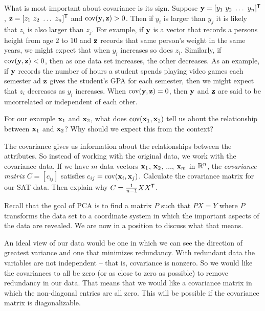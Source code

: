 \begin{pactivity}
\item  What is most important about covariance is its sign. Suppose $\mathbf{y} = [y_1 \ y_2 \ \ldots \ y_n]^{\mathsf{T}}$, $\vz = [z_1 \ z_2 \ \ldots \ z_n]^{\tr}$ and $\text{cov}(\mathbf{y},\mathbf{z}) > 0$. Then if $y_i$ is larger than $y_j$ it is likely that $z_i$ is also larger than $z_j$. For example, if $\mathbf{y}$ is a vector that records a persons height from age $2$ to $10$ and $\mathbf{z}$ records that same person's weight in the same years, we might expect that when $y_i$ increases so does $z_i$. Similarly, if $\text{cov}(\mathbf{y},\mathbf{z}) < 0$, then as one data set increases, the other decreases. As an example, if $\mathbf{y}$ records the number of hours a student spends playing video games each semester ad $\mathbf{z}$ gives the student's GPA for each semester, then we might expect that $z_i$ decreases as $y_i$ increases. When $\text{cov}(\mathbf{y},\mathbf{z}) = 0$, then $\mathbf{y}$ and $\mathbf{z}$ are said to be uncorrelated or independent of each other. 

For our example $\mathbf{x}_1$ and $\mathbf{x}_2$, what does $\text{cov}(\mathbf{x}_1,\mathbf{x}_2)$ tell us about the relationship between $\mathbf{x}_1$ and $\mathbf{x}_2$? Why should we expect this from the context?

 
\item The covariance gives us information about the relationships between the attributes. So instead of working with the original data, we work with the covariance data. If we have $m$ data vectors $\mathbf{x}_1$, $\mathbf{x}_2$, $\ldots$, $\mathbf{x}_m$ in $\mathbb{R}^n$, the \emph{covariance matrix} $C = [c_{ij}]$ satisfies $c_{ij} = \text{cov}(\mathbf{x}_i, \mathbf{x}_j)$. Calculate the covariance matrix for our SAT data. Then explain why $C = \frac{1}{n-1}XX^{\mathsf{T}}$. 

\ea

\end{pactivity}

Recall that the goal of PCA is to find a matrix $P$ such that $PX = Y$ where $P$ transforms the data set to a coordinate system in which the important aspects of the data are revealed. We are now in a position to discuss what that means. 

An ideal view of our data would be one in which we can see the direction of greatest variance and one that minimizes redundancy. With redundant data the variables are not independent -- that is, covariance is nonzero. So we would like the covariances to all be zero (or as close to zero as possible) to remove redundancy in our data. That means that we would like a covariance matrix in which the non-diagonal entries are all zero. This will be possible if the covariance matrix is diagonalizable. 

